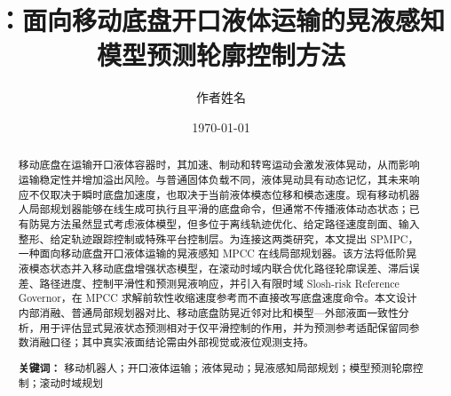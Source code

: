 \documentclass[12pt,a4paper]{ctexart}
\title{\SPMPC{}：面向移动底盘开口液体运输的晃液感知模型预测轮廓控制方法}
\author{作者姓名}
\date{\today}
\newcommand{\SPMPC}{SPMPC}
\newcommand{\MPCC}{MPCC}
\begin{document}
\maketitle

\begin{abstract}
移动底盘在运输开口液体容器时，其加速、制动和转弯运动会激发液体晃动，从而影响运输稳定性并增加溢出风险。与普通固体负载不同，液体晃动具有动态记忆，其未来响应不仅取决于瞬时底盘加速度，也取决于当前液体模态位移和模态速度。现有移动机器人局部规划器能够在线生成可执行且平滑的底盘命令，但通常不传播液体动态状态；已有防晃方法虽然显式考虑液体模型，但多位于离线轨迹优化、给定路径速度剖面、输入整形、给定轨迹跟踪控制或特殊平台控制层。为连接这两类研究，本文提出 \SPMPC{}，一种面向移动底盘开口液体运输的晃液感知 \MPCC{} 在线局部规划器。该方法将低阶晃液模态状态并入移动底盘增强状态模型，在滚动时域内联合优化路径轮廓误差、滞后误差、路径进度、控制平滑性和预测晃液响应，并引入有限时域 Slosh-risk Reference Governor，在 \MPCC{} 求解前软性收缩速度参考而不直接改写底盘速度命令。本文设计内部消融、普通局部规划器对比、移动底盘防晃近邻对比和模型—外部液面一致性分析，用于评估显式晃液状态预测相对于仅平滑控制的作用，并为预测参考适配保留同参数消融口径；其中真实液面结论需由外部视觉或液位观测支持。

\vspace{0.5em}
\noindent\textbf{关键词：}
移动机器人；开口液体运输；液体晃动；晃液感知局部规划；模型预测轮廓控制；滚动时域规划
\end{abstract}









\end{document}
